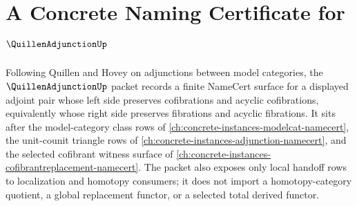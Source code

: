 \chapter{A Concrete Naming Certificate for $\QuillenAdjunctionUp$}
\label{ch:concrete-instances-quillen-adjunction-namecert}

Following Quillen and Hovey on adjunctions between model categories, the $\QuillenAdjunctionUp$ packet records a finite NameCert surface for a displayed adjoint pair whose left side preserves cofibrations and acyclic cofibrations, equivalently whose right side preserves fibrations and acyclic fibrations. It sits after the model-category class rows of \autoref{ch:concrete-instances-modelcat-namecert}, the unit-counit triangle rows of \autoref{ch:concrete-instances-adjunction-namecert}, and the selected cofibrant witness surface of \autoref{ch:concrete-instances-cofibrantreplacement-namecert}. The packet also exposes only local handoff rows to localization and homotopy consumers; it does not import a homotopy-category quotient, a global replacement functor, or a selected total derived functor.

